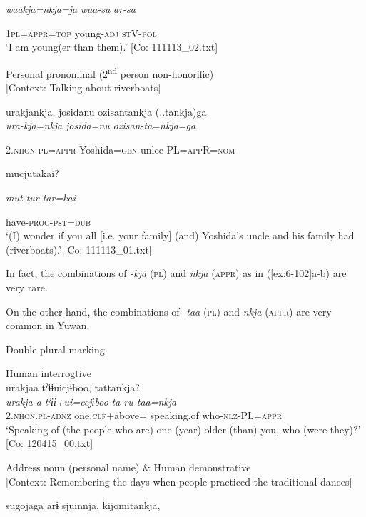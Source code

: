 \begin{table}
      \textit{waakja=nkja=ja}  \textit{waa-sa}  \textit{ar-sa}

      1\textsc{pl}=\textsc{appr}=\textsc{top}  young-\textsc{adj}  \textsc{st}V-\textsc{pol}\\
\glt ‘I am young(er than them).’ [Co: 111113\_02.txt]
\z

\ex Personal pronominal (2\textsuperscript{nd} person non-honorific)\\{}
[Context: Talking about riverboats]

{\TM}
\glll urakjankja,  josidanu  ozisantankja (..tankja)ga\\

      \textit{ura-kja=nkja}  \textit{josida=nu}  \textit{ozisan-ta=nkja=ga}

      2.\textsc{nhon}-\textsc{pl}=\textsc{appr}  Yoshida=\textsc{gen}  unlce-PL=\textsc{app}R=\textsc{nom}

      mucjutakai?

      \textit{mut-tur-tar=kai}

      have-\textsc{prog}-\textsc{pst}=\textsc{dub}\\
\glt ‘(I) wonder if you all [i.e. your family] (and) Yoshida’s uncle and his family had (riverboats).’ [Co: 111113\_01.txt]
\z

In fact, the combinations of \textit{-kja} (\textsc{pl}) and \textit{nkja} (\textsc{appr}) as in (\ref{ex:6-102}a-b) are very rare.

On the other hand, the combinations of \textit{-taa} (\textsc{pl}) and \textit{nkja} (\textsc{appr}) are very common in Yuwan.

\ea\label{ex:6-103}
  Double plural marking

 \ea Human interrogtive\\
{\TM}
\glll  urakjaa  tˀɨɨuicjɨboo,  tattankja?\\
\textit{urakja-a}  \textit{tˀɨɨ+ui=ccjɨboo}  \textit{ta-ru-taa=nkja}\\
2.\textsc{nhon}.\textsc{pl}-\textsc{adnz}  one.\textsc{clf}+above= speaking.of  who-\textsc{nlz}-PL=\textsc{appr}\\
\glt ‘Speaking of (the people who are) one (year) older (than) you, who (were they)?’ [Co: 120415\_00.txt]
\z

\ex Address noun (personal name) \& Human demonstrative\\{}
[Context: Remembering the days when people practiced the traditional dances]

{\TM}
\glll sugojaga  arɨ  sjuinnja,  kijomitankja,\\


\end{table}
